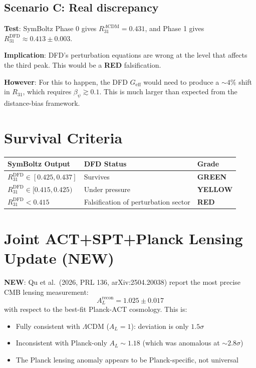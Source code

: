 \documentclass[11pt,a4paper]{article}
\newcommand{\GREEN}{\textcolor{dfdgreen}{\textbf{GREEN}}}
\newcommand{\YELLOW}{\textcolor{dfdyellow}{\textbf{YELLOW}}}
\newcommand{\RED}{\textcolor{dfdred}{\textbf{RED}}}
\newcommand{\NEW}{\textcolor{dfdblue}{\textbf{NEW}}}
\begin{document}
\subsection{Scenario C: Real discrepancy}

\textbf{Test}: SymBoltz Phase 0 gives $R_{31}^{\Lambda\text{CDM}} = 0.431$, and Phase 1 gives $R_{31}^{\mathrm{DFD}} \approx 0.413 \pm 0.003$.

\textbf{Implication}: DFD's perturbation equations are wrong at the level that affects the third peak. This would be a \RED{} falsification.

\textbf{However}: For this to happen, the DFD $G_{\mathrm{eff}}$ would need to produce a $\sim 4\%$ shift in $R_{31}$, which requires $\beta_\psi \gtrsim 0.1$. This is much larger than expected from the distance-bias framework.

\section{Survival Criteria}

\begin{center}
\begin{tabular}{lll}
\toprule
\textbf{SymBoltz Output} & \textbf{DFD Status} & \textbf{Grade} \\
\midrule
$R_{31}^{\mathrm{DFD}} \in [0.425, 0.437]$ & Survives & \GREEN \\
$R_{31}^{\mathrm{DFD}} \in [0.415, 0.425)$ & Under pressure & \YELLOW \\
$R_{31}^{\mathrm{DFD}} < 0.415$ & Falsification of perturbation sector & \RED \\
\bottomrule
\end{tabular}
\end{center}

\section{Joint ACT+SPT+Planck Lensing Update (NEW)}

\textbf{\NEW}: Qu et al.\ (2026, PRL 136, arXiv:2504.20038) report the most precise CMB lensing measurement:
\begin{equation}
A_L^{\mathrm{recon}} = 1.025 \pm 0.017
\end{equation}
with respect to the best-fit Planck-ACT cosmology. This is:
\begin{itemize}
\item Fully consistent with $\Lambda$CDM ($A_L = 1$): deviation is only $1.5\sigma$
\item Inconsistent with Planck-only $A_L \sim 1.18$ (which was anomalous at $\sim 2.8\sigma$)
\item The Planck lensing anomaly appears to be Planck-specific, not universal
\end{itemize}
\end{document}
